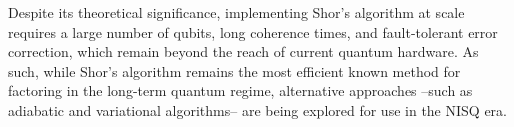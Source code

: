Despite its theoretical significance, implementing Shor's algorithm at scale requires a
large number of qubits, long coherence times, and fault-tolerant error correction,
which remain beyond the reach of current quantum hardware. As such, while Shor's algorithm remains
the most efficient known method for factoring in the long-term quantum regime, alternative approaches
--such as adiabatic and variational algorithms-- are being explored for use in the NISQ era.